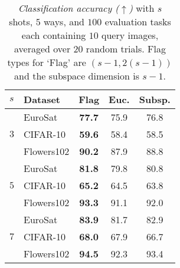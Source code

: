 \documentclass[10pt,twocolumn,letterpaper]{article}
\begin{document}
\begin{table}[ht!]
    \centering
    \caption{\emph{Classification accuracy ($\uparrow$)} with $s$ shots, $5$ ways, and $100$ evaluation tasks each containing $10$ query images, averaged over $20$ random trials. Flag types for `Flag' are $(s-1,2(s-1))$ and the subspace dimension is $s-1$.}
    \label{tab:fewshot_forpaper}
    \begin{tabular}{llccc}
    \toprule
    $s$ & Dataset & Flag & Euc. & Subsp.\\
    \midrule
    \multirow{3}{*}{$3$} & EuroSat & \textbf{77.7} & 75.9 & 76.8 \\
     & CIFAR-10 & \textbf{59.6} & 58.4 & 58.5 \\
     & Flowers102 & \textbf{90.2} & 87.9 & 88.8 \\
    \cline{1-5}
    \multirow{3}{*}{$5$} & EuroSat & \textbf{81.8} & 79.8 & 80.8 \\
     & CIFAR-10 & \textbf{65.2} & 64.5 & 63.8 \\
     & Flowers102 & \textbf{93.3} & 91.1 & 92.0 \\
    \cline{1-5}
    \multirow{3}{*}{$7$} & EuroSat & \textbf{83.9} & 81.7 & 82.9 \\
     & CIFAR-10 & \textbf{68.0} & 67.9 & 66.7 \\
     & Flowers102 & \textbf{94.5} & 92.3 & 93.4 \\
    \bottomrule
    \end{tabular}
\end{table}
\end{document}
